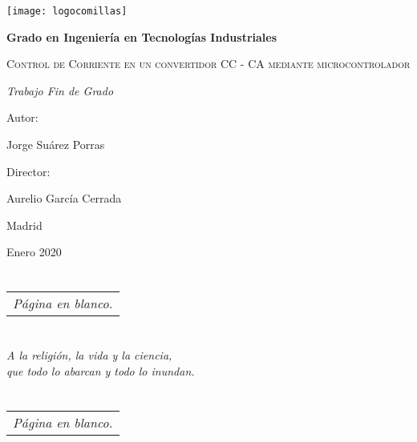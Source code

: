 \documentclass{report}
\begin{document}
\begin{titlepage}
    \centering
    {\texttt{[image: logocomillas]}\par}
    \vspace{0.5cm}
    {\bfseries\LARGE Grado en Ingeniería en Tecnologías Industriales \par}
    \vspace{2cm}
    {\scshape\LARGE Control de Corriente en un convertidor CC - CA mediante microcontrolador \par}
    \vspace{2cm}
    {\itshape\Large Trabajo Fin de Grado \par}
    \vspace{0.5cm}
    {\Large Autor: \par}
    {\Large Jorge Suárez Porras \par}
    \vspace{0.5cm}
    {\Large Director: \par}
    {\Large Aurelio García Cerrada \par}
    \vspace{0.5cm}
    {\Large Madrid \par}
    {\Large Enero 2020 \par}


\end{titlepage}

\newpage
{}
\section*{}
\vspace{8cm}
\begin{center}
    \begin{tabular}{@{}l@{}}
    \textit{Página en blanco.}
    \end{tabular}
    \end{center}

\newpage

\section*{}
\begin{flushright}
     \vspace{9cm}
\textit{A la religión, la vida y la ciencia, \\que todo lo abarcan y todo lo inundan.}
\end{flushright}

\newpage
\section*{}
\vspace{8cm}
\begin{center}
    \begin{tabular}{@{}l@{}}
    \textit{Página en blanco.}
    \end{tabular}
    \end{center}
\end{document}
